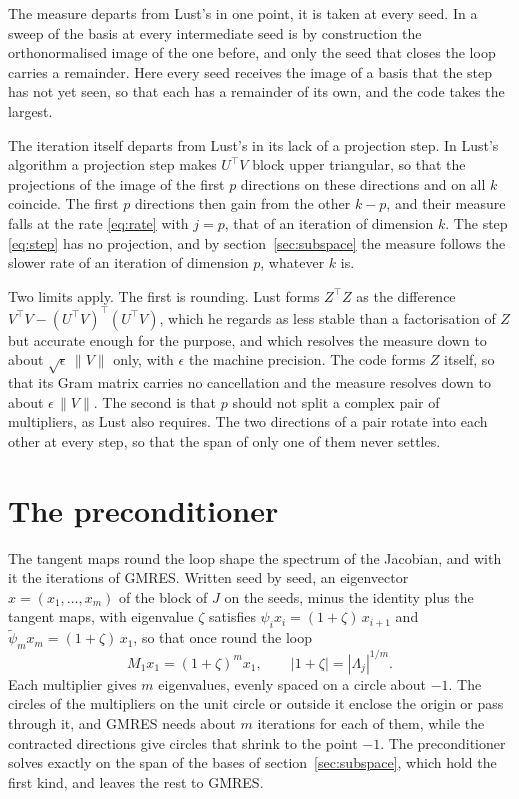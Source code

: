 \documentclass[11pt,a4paper]{article}
\begin{document}
The measure departs from Lust's in one point, it is taken at every seed. In a sweep of
\citet[algorithm 6.2]{lust1997} the basis at every intermediate seed is by construction the
orthonormalised image of the one before, and only the seed that closes the loop carries a
remainder. Here every seed receives the image of a basis that the step has not yet seen, so that
each has a remainder of its own, and the code takes the largest.

The iteration itself departs from Lust's in its lack of a projection step. In Lust's algorithm a
projection step makes $U^{\!\top} V$ block upper triangular, so that the projections of the image
of the first $p$ directions on these directions and on all $k$ coincide. The first $p$ directions
then gain from the other $k - p$, and their measure falls at the rate \eqref{eq:rate} with
$j = p$, that of an iteration of dimension $k$. The step \eqref{eq:step} has no projection, and by
section~\ref{sec:subspace} the measure follows the slower rate of an iteration of dimension $p$,
whatever $k$ is.

Two limits apply. The first is rounding. Lust forms $Z^{\!\top}Z$ as the difference
$V^{\!\top}V - (U^{\!\top}V)^{\!\top}(U^{\!\top}V)$, which he regards as less stable than a
factorisation of $Z$ but accurate enough for the purpose, and which resolves the measure down to
about $\sqrt{\epsilon}\,\|V\|$ only, with $\epsilon$ the machine precision. The code forms $Z$
itself, so that its Gram matrix carries no cancellation and the measure resolves down to about
$\epsilon\,\|V\|$. The second is that $p$ should not split
a complex pair of multipliers, as Lust also requires. The two directions of a pair rotate into
each other at every step, so that the span of only one of them never settles.

\section{The preconditioner}
\label{sec:preconditioner}

The tangent maps round the loop shape the spectrum of the Jacobian, and with it the iterations of
GMRES. Written seed by seed, an eigenvector $x = (x_1, \dots, x_m)$ of the block of $J$ on the
seeds, minus the identity plus the tangent maps, with eigenvalue $\zeta$ satisfies
$\psi_i x_i = (1 + \zeta)\, x_{i+1}$ and $\tilde\psi_m x_m = (1 + \zeta)\, x_1$, so that once round
the loop
\begin{equation}
  M_1 x_1 = (1 + \zeta)^m x_1, \qquad |1 + \zeta| = |\Lambda_j|^{1/m} .
  \label{eq:circles}
\end{equation}
Each multiplier gives $m$ eigenvalues, evenly spaced on a circle about $-1$. The circles of the
multipliers on the unit circle or outside it enclose the origin or pass through it, and GMRES
needs about $m$ iterations for each of them, while the contracted directions give circles that
shrink to the point $-1$. The preconditioner solves exactly on the span of the bases of
section~\ref{sec:subspace}, which hold the first kind, and leaves the rest to GMRES.
\end{document}
